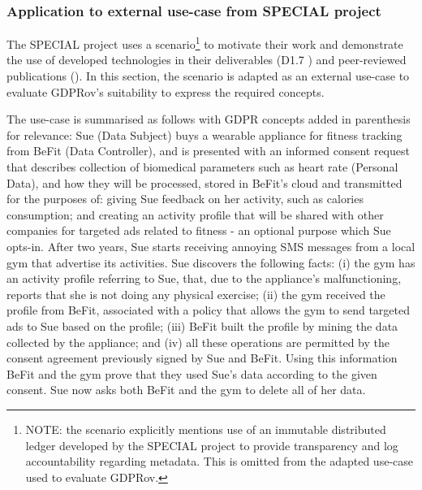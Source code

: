 \subsubsection{Application to external use-case from SPECIAL project}\label{sec:gdprov:use-case:SPECIAL}
The SPECIAL project uses a scenario\footnote{NOTE: the scenario explicitly mentions use of an immutable distributed ledger developed by the SPECIAL project to provide transparency and log accountability regarding metadata. This is omitted from the adapted use-case used to evaluate GDPRov.} to motivate their work and demonstrate the use of developed technologies in their deliverables (D1.7 \cite{bonatti_d1.7_2018}) and peer-reviewed publications (\cite{kirrane_scalable_2018}).
In this section, the scenario is adapted as an external use-case to evaluate GDPRov's suitability to express the required concepts.

The use-case is summarised as follows with GDPR concepts added in parenthesis for relevance: Sue (Data Subject) buys a wearable appliance for fitness tracking from BeFit (Data Controller), and is presented with an informed consent request that describes collection of biomedical parameters such as heart rate (Personal Data), and how they will be processed, stored in BeFit's cloud and transmitted for the purposes of: giving Sue feedback on her activity, such as calories consumption; and creating an activity profile that will be shared with other companies for targeted ads related to fitness - an optional purpose which Sue opts-in. After two years, Sue starts receiving annoying SMS messages from a local gym that advertise its activities. Sue discovers the following facts: (i) the gym has an activity profile referring to Sue, that, due to the appliance’s malfunctioning, reports that she is not doing any physical exercise; (ii) the gym received the profile from BeFit, associated with a policy that allows the gym to send targeted ads to Sue based on the profile; (iii) BeFit built the profile by mining the data collected by the appliance; and (iv) all these operations are permitted by the consent agreement previously signed by Sue and BeFit. Using this information BeFit and the gym prove that they used Sue’s data according to the given consent. Sue now asks both BeFit and the gym to delete all of her data. 

